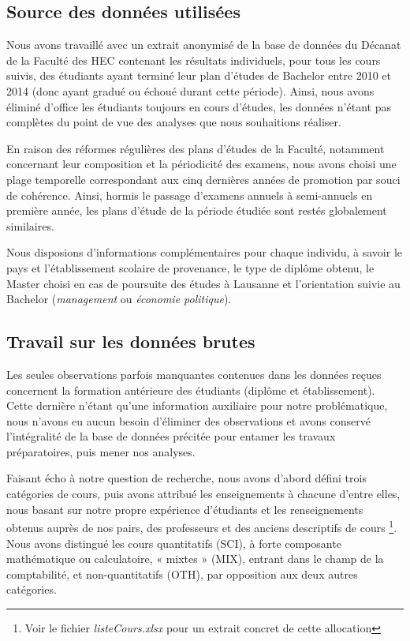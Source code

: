 
\subsection{Source des données utilisées}
Nous avons travaillé avec un extrait anonymisé de la base de données du Décanat de la Faculté des HEC contenant les résultats individuels, pour tous les cours suivis, des étudiants ayant terminé leur plan d’études de Bachelor entre 2010 et 2014 (donc ayant gradué ou échoué durant cette période). Ainsi, nous avons éliminé d’office les étudiants toujours en cours d’études, les données n’étant pas complètes du point de vue des analyses que nous souhaitions réaliser.

En raison des réformes régulières des plans d’études de la Faculté, notamment concernant leur composition et la périodicité des examens, nous avons choisi une plage temporelle correspondant aux cinq dernières années de promotion par souci de cohérence. Ainsi, hormis le passage d’examens annuels à semi-annuels en première année, les plans d’étude de la période étudiée sont restés globalement similaires.

Nous disposions d'informations complémentaires pour chaque individu, à savoir le pays et l’établissement scolaire de provenance, le type de diplôme obtenu, le Master choisi en cas de poursuite des études à Lausanne et l’orientation suivie au Bachelor (\textit{management} ou \textit{économie politique}).

\subsection{Travail sur les données brutes}
Les seules observations parfois manquantes contenues dans les données reçues concernent la formation antérieure des étudiants (diplôme et établissement). Cette dernière n'étant qu'une information auxiliaire pour notre problématique, nous n’avons eu aucun besoin d’éliminer des observations et avons conservé l’intégralité de la base de données précitée pour entamer les travaux préparatoires, puis mener nos analyses.

Faisant écho à notre question de recherche, nous avons d’abord défini trois catégories de cours, puis avons attribué les enseignements à chacune d’entre elles, nous basant sur notre propre expérience d’étudiants et les renseignements obtenus auprès de nos pairs, des professeurs et des anciens descriptifs de cours \footnote{Voir le fichier \textit{listeCours.xlsx} pour un extrait concret de cette allocation}. Nous avons distingué les cours quantitatifs (SCI), à forte composante mathématique ou calculatoire, « mixtes » (MIX), entrant dans le champ de la comptabilité, et non-quantitatifs (OTH), par opposition aux deux autres catégories.

